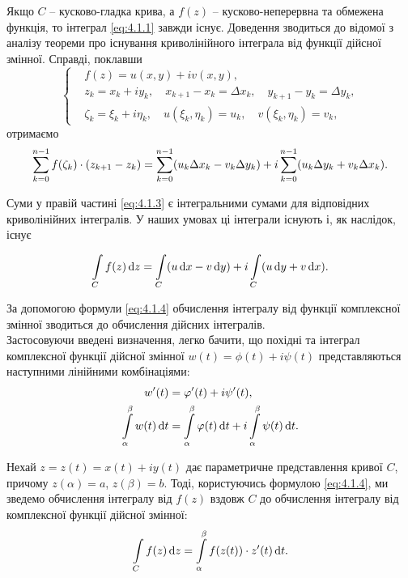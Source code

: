 Якщо $C$ -- кусково-гладка крива, а $f(z)$ -- кусково-неперервна та обмежена функція, то інтеграл \eqref{eq:4.1.1} завжди існує. Доведення зводиться до відомої з аналізу теореми про існування криволінійного інтеграла від функції дійсної змінної. Справді, поклавши
\begin{equation}
	\label{eq:4.1.2}
	\left\{
		\begin{aligned}
			& f(z) = u(x, y) + i v(x, y), \\
			& z_k = x_k + i y_k, \quad x_{k + 1} - x_k = \Delta x_k, \quad y_{k + 1} - y_k = \Delta y_k, \\
			& \zeta_k = \xi_k + i \eta_k, \quad u(\xi_k, \eta_k) = u_k, \quad v(\xi_k, \eta_k) = v_k,
		\end{aligned}
	\right.
\end{equation}
отримаємо
\begin{equation}
	\label{eq:4.1.3}
	\displaystyle\sum\limits_{k = 0}^{n - 1} f(\zeta_k) \cdot (z_{k + 1} - z_k) = \displaystyle\sum\limits_{k = 0}^{n - 1} (u_k \Delta x_k - v_k \Delta y_k) + i \displaystyle\sum\limits_{k = 0}^{n - 1} (u_k \Delta y_k + v_k \Delta x_k).
\end{equation}

Суми у правій частині \eqref{eq:4.1.3} є інтегральними сумами для відповідних криволінійних інтегралів. У наших умовах ці інтеграли існують і, як наслідок, існує

\begin{equation}
	\label{eq:4.1.4}
	\displaystyle\int\limits_C f(z) \mathop{}\!\mathrm{d} z = \displaystyle\int\limits_C (u \mathop{}\!\mathrm{d} x - v \mathop{}\!\mathrm{d} y) + i \displaystyle\int\limits_C (u \mathop{}\!\mathrm{d} y + v \mathop{}\!\mathrm{d} x).
\end{equation}

За допомогою формули \eqref{eq:4.1.4} обчислення інтегралу від функції комплексної змінної зводиться до обчислення дійсних інтегралів. \\

Застосовуючи введені визначення, легко бачити, що похідні та інтеграл комплексної функції дійсної змінної $w(t) = \phi(t) + i \psi(t)$ представляються наступними лінійними комбінаціями:
\begin{align}
	\label{eq:4.1.5}
	w'(t) &= \varphi'(t) + i \psi'(t), \\
	\label{eq:4.1.6}
	\displaystyle\int\limits_\alpha^\beta w(t) \mathop{}\!\mathrm{d} t &= \displaystyle\int\limits_\alpha^\beta \varphi(t) \mathop{}\!\mathrm{d} t + i \displaystyle\int\limits_\alpha^\beta \psi(t) \mathop{}\!\mathrm{d} t.
\end{align}

Нехай $z = z(t) = x(t) + i y(t)$ дає параметричне представлення кривої $C$, причому $z(\alpha) = a$, $z(\beta) = b$. Тоді, користуючись формулою \eqref{eq:4.1.4}, ми зведемо обчислення інтегралу від $f(z)$ вздовж $C$ до обчислення інтегралу від комплексної функції дійсної змінної:
\begin{equation}
	\label{eq:4.1.7}
	\displaystyle\int\limits_C f(z) \mathop{}\!\mathrm{d} z = \displaystyle\int\limits_\alpha^\beta f(z(t)) \cdot z'(t) \mathop{}\!\mathrm{d} t.
\end{equation}

